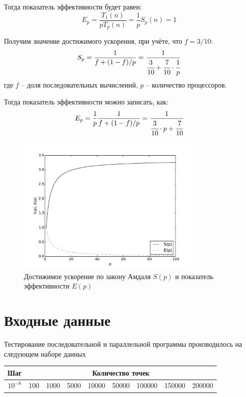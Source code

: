 \documentclass[14pt,final,titlepage,pscyr]{hedwork}
\begin{document}
Тогда показатель эффективности будет равен:
\[
	E_p = \frac{T_1(n)}{pT_p(n)} = \frac{1}{p}S_p(n) = 1
\]

\newpage

Получим значение достижимого ускорения, при учёте, что \( f = 3/10 \):
\[
    S_p = \frac{1}{f + (1-f)/p} = \frac{1}{\cfrac{3}{10} + \cfrac{7}{10} \cdot \cfrac{1}{p}}
\]
где \( f \) -- доля последовательных вычислений, \( p \) -- количество процессоров.

Тогда показатель эффективности можно записать, как:
\[
    E_p = \frac{1}{p}\frac{1}{f + (1-f)/p} = \frac{1}{\cfrac{3}{10}\cdot p + \cfrac{7}{10}}
\]

\begin{figure}[ht!]
    \center
    \includegraphics[width=0.8\textwidth]{amhdal_eff}
    \caption{Достижимое ускорение по закону Амдаля \( S(p) \) и показатель эффективности \( E(p) \)}
\end{figure}

\newpage

\section{Входные данные}
Тестирование последовательной и параллельной программы производилось на следующем наборе данных
\begin{table}[h]
    \center
	\begin{tabular}{|c|c|c|c|c|c|c|c|c|}
		\hline
		Шаг & \multicolumn{8}{c|}{Количество точек} \\ \hline
		\( 10^{-8} \) & 100 & 1000 & 5000 & 10000 & 50000 & 100000 & 150000 & 200000 \\ 
		\hline
	\end{tabular}
\end{table}
\end{document}
